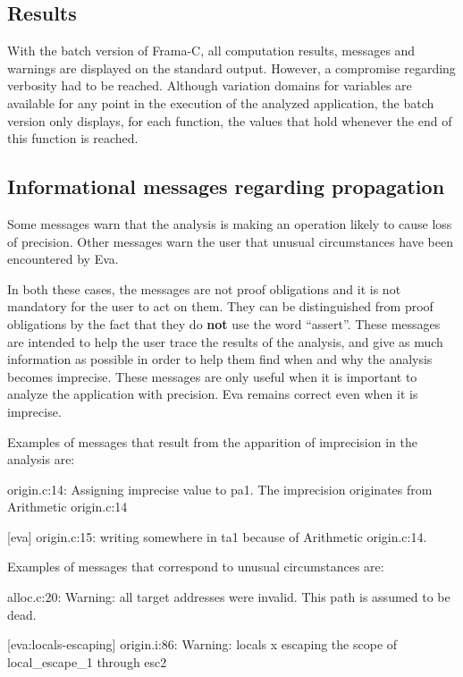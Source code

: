 \documentclass[web]{frama-c-book}
\newcommand{\Eva}{\textsf{Eva}}
\begin{document}
\subsection{Results}

With the batch version of Frama-C, all computation results,
messages and warnings are displayed on the standard output.
However, a compromise regarding verbosity had to
be reached. Although variation domains for variables
are available for any point in the execution of the analyzed application,
the batch version only displays, for each function, the values that
hold whenever the end of this function is reached.



\subsection{Informational messages regarding propagation}

Some messages warn that the analysis is making an operation likely
to cause loss of precision. Other messages warn the user that
unusual circumstances have been encountered by \Eva{}. 

In both these cases, the messages are not proof
obligations and it is not mandatory for the user to act on them. 
They can be distinguished from proof obligations by the fact that
they do {\bf not} use the word ``assert''.
These messages
are intended to help the user trace the results of the analysis, and
give as much information as possible in order to help 
them find when and why the analysis becomes imprecise.
These messages are only useful when it is important to analyze the application
with precision. \Eva{} remains correct even when it
is imprecise.
\smallskip

Examples of messages that result from the apparition of imprecision in the
analysis are:
\begin{logs}
[eva] origin.c:14:
  Assigning imprecise value to pa1.
  The imprecision originates from Arithmetic {origin.c:14}

[eva] origin.c:15:
  writing somewhere in {ta1} because of Arithmetic {origin.c:14}.
\end{logs}

Examples of messages that correspond to unusual circumstances are:
\begin{logs}
[kernel] alloc.c:20: Warning:
  all target addresses were invalid. This path is assumed to be dead.

[eva:locals-escaping] origin.i:86: Warning:
  locals {x} escaping the scope of local_escape_1 through esc2
\end{logs}
\end{document}
